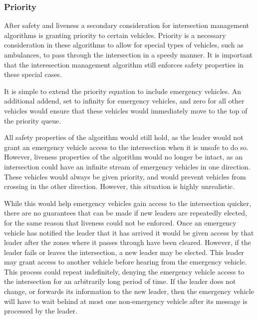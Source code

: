 \documentclass[12pt]{article}
\begin{document}
\subsubsection{Priority}
After safety and liveness a secondary consideration for intersection management algorithms is granting priority to certain vehicles. Priority is a necessary consideration in these algorithms to allow for special types of vehicles, such as ambulances, to pass through the intersection in a speedy manner. It is important that the interesection management algorithm still enforces safety properties in these special cases.\par
It is simple to extend the priority equation to include emergency vehicles. An additional addend, set to infinity for emergency vehicles, and zero for all other vehicles would ensure that these vehicles would immediately move to the top of the priority queue.\par
 All safety properties of the algorithm would still hold, as the leader would not grant an emergency vehicle access to the intersection when it is unsafe to do so. However, liveness properties of the algorithm would no longer be intact, as an intersection could have an infinite stream of emergency vehicles in one direction. These vehicles would always be given priority, and would prevent vehicles from crossing in the other direction. However, this situation is highly unrealistic. \par
While this would help emergency vehicles gain access to the intersection quicker, there are no guarantees that can be made if new leaders are repeatedly elected, for the same reason that liveness could not be enforced. Once an emergency vehicle has notified the leader that it has arrived it would be given access by that leader after the zones where it passes through have been cleared. However, if the leader fails or leaves the intersection, a new leader may be elected. This leader may grant access to another vehicle before hearing from the emergency vehicle. This process could repeat indefinitely, denying the emergency vehicle access to the intersection for an arbitrarily long period of time. If the leader does not change, or forwards its information to the new leader, then the emergency vehicle will have to wait behind at most one non-emergency vehicle after its message is processed by the leader.\par
\end{document}
